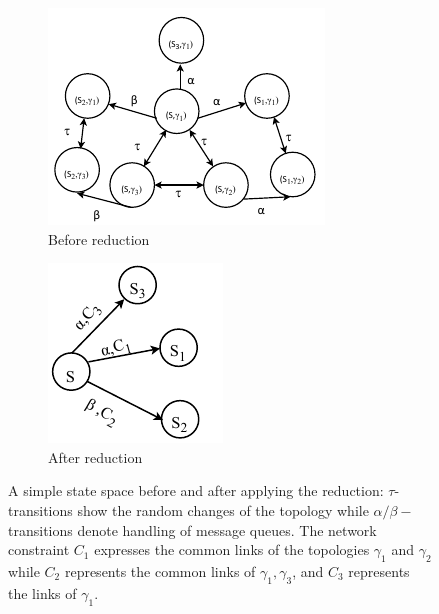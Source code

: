 \begin{figure}[h]
	\begin{subfigure}[b]{0.32\textwidth}
		\includegraphics[width=\textwidth]{resources/st-before.pdf}
		\caption{Before reduction}\label{Fig::stbefore}	
	\end{subfigure}
	\begin{subfigure}[b]{0.14\textwidth}
		\includegraphics[width=\textwidth]{resources/st-after.pdf}
		\caption{After reduction}\label{Fig::stafter}	
	\end{subfigure}
	\caption{A simple state space before and after applying the reduction: $\tau$-transitions show the random changes of the topology while $\alpha/\beta-$transitions denote handling of message queues. The network constraint $C_1$ expresses the common links of the topologies $\gamma_{1}$ and $\gamma_2$ while $C_2$ represents the common links of $\gamma_1,\gamma_3$, and $C_3$ represents the links of $\gamma_1$.
	}\label{Fig::reductionidea}	
\end{figure}

